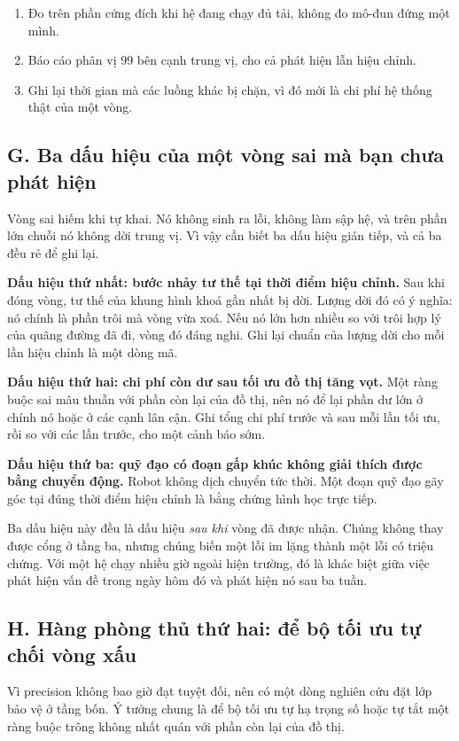 \documentclass[../../deep_learning.tex]{subfiles}
\begin{document}
\begin{enumerate}
\item Đo trên phần cứng đích khi hệ đang chạy đủ tải, không đo mô-đun đứng một mình.
\item Báo cáo phân vị 99 bên cạnh trung vị, cho cả phát hiện lẫn hiệu chỉnh.
\item Ghi lại thời gian mà các luồng khác bị chặn, vì đó mới là chi phí hệ thống thật của một vòng.
\end{enumerate}

\subsection{G. Ba dấu hiệu của một vòng sai mà bạn chưa phát hiện}
Vòng sai hiếm khi tự khai. Nó không sinh ra lỗi, không làm sập hệ, và trên phần lớn chuỗi nó không dời trung vị. Vì vậy cần biết ba dấu hiệu gián tiếp, và cả ba đều rẻ để ghi lại.

\textbf{Dấu hiệu thứ nhất: bước nhảy tư thế tại thời điểm hiệu chỉnh.} Sau khi đóng vòng, tư thế của khung hình khoá gần nhất bị dời. Lượng dời đó có ý nghĩa: nó chính là phần trôi mà vòng vừa xoá. Nếu nó lớn hơn nhiều so với trôi hợp lý của quãng đường đã đi, vòng đó đáng nghi. Ghi lại chuẩn của lượng dời cho mỗi lần hiệu chỉnh là một dòng mã.

\textbf{Dấu hiệu thứ hai: chi phí còn dư sau tối ưu đồ thị tăng vọt.} Một ràng buộc sai mâu thuẫn với phần còn lại của đồ thị, nên nó để lại phần dư lớn ở chính nó hoặc ở các cạnh lân cận. Ghi tổng chi phí trước và sau mỗi lần tối ưu, rồi so với các lần trước, cho một cảnh báo sớm.

\textbf{Dấu hiệu thứ ba: quỹ đạo có đoạn gấp khúc không giải thích được bằng chuyển động.} Robot không dịch chuyển tức thời. Một đoạn quỹ đạo gãy góc tại đúng thời điểm hiệu chỉnh là bằng chứng hình học trực tiếp.

Ba dấu hiệu này đều là dấu hiệu \emph{sau khi} vòng đã được nhận. Chúng không thay được cổng ở tầng ba, nhưng chúng biến một lỗi im lặng thành một lỗi có triệu chứng. Với một hệ chạy nhiều giờ ngoài hiện trường, đó là khác biệt giữa việc phát hiện vấn đề trong ngày hôm đó và phát hiện nó sau ba tuần.

\subsection{H. Hàng phòng thủ thứ hai: để bộ tối ưu tự chối vòng xấu}
Vì precision không bao giờ đạt tuyệt đối, nên có một dòng nghiên cứu đặt lớp bảo vệ ở tầng bốn. Ý tưởng chung là để bộ tối ưu tự hạ trọng số hoặc tự tắt một ràng buộc trông không nhất quán với phần còn lại của đồ thị.
\end{document}
